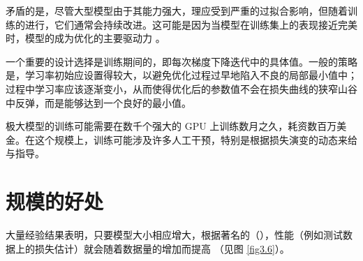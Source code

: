 矛盾的是，尽管大型模型由于其能力强大，理应受到严重的过拟合影响，但随着训练的进行，它们通常会持续改进。这可能是因为当模型在训练集上的表现接近完美时，模型的成为优化的主要驱动力 \citep{arxiv-1812.11118}。

一个重要的设计选择是训练期间的，即每次梯度下降迭代中的具体值。一般的策略是，学习率初始应设置得较大，以避免优化过程过早地陷入不良的局部最小值中；过程中学习率应该逐渐变小，从而使得优化后的参数值不会在损失曲线的狭窄山谷中反弹，而是能够达到一个良好的最小值。

极大模型的训练可能需要在数千个强大的 GPU 上训练数月之久，耗资数百万美金。在这个规模上，训练可能涉及许多人工干预，特别是根据损失演变的动态来给与指导。

\section{规模的好处}

大量经验结果表明，只要模型大小相应增大，根据著名的（），性能（例如测试数据上的损失估计）就会随着数据量的增加而提高 \citep{arxiv-2001.08361}（见图 \ref{fig3.6}）。

